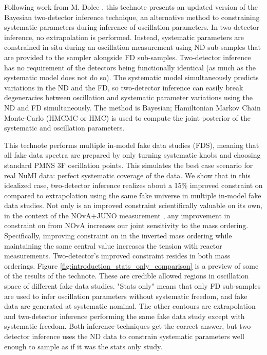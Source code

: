 \documentclass{article}
\begin{document}
Following work from M. Dolce \cite{ref:mike_thesis}, this technote presents an updated version of the Bayesian two-detector inference technique, an alternative method to constraining systematic parameters during inference of oscillation parameters. In two-detector inference, no extrapolation is performed. Instead, systematic parameters are constrained in-situ during an oscillation measurement using ND sub-samples that are provided to the sampler alongside FD sub-samples. Two-detector inference has no requirement of the detectors being functionally identical (as much as the systematic model does not do so). The systematic model simultaneously predicts variations in the ND and the FD, so two-detector inference can easily break degeneracies between oscillation and systematic parameter variations using the ND and FD simultaneously. The method is Bayesian; Hamiltonian Markov Chain Monte-Carlo (HMCMC or HMC) is used to compute the joint posterior of the systematic and oscillation parameters.

This technote performs multiple in-model fake data studies (FDS), meaning that all fake data spectra are prepared by only turning systematic knobs and choosing standard PMNS 3F oscillation points. This simulates the best case scenario for real NuMI data: perfect systematic coverage of the data. We show that in this idealized case, two-detector inference realizes about a 15\% improved constraint on  compared to extrapolation using the same fake universe in multiple in-model fake data studies. Not only is an improved constraint scientifically valuable on its own, in the context of the NOvA+JUNO measurement \cite{ref:nova_juno_paper} \cite{ref:juno_2026}, any improvement in constraint on  from NOvA increases our joint sensitivity to the mass ordering. Specifically, improving constraint on  in the inverted mass ordering while maintaining the same central value increases the tension with reactor measurements. Two-detector's improved constraint resides in both mass orderings. Figure \ref{fig:introduction_stats_only_comparison} is a preview of some of the results of the technote. These are credible allowed regions in oscillation space of different fake data studies. "Stats only" means that only FD sub-samples are used to infer oscillation parameters without systematic freedom, and fake data are generated at systematic nominal. The other contours are extrapolation and two-detector inference performing the same fake data study except with systematic freedom. Both inference techniques get the correct answer, but two-detector inference uses the ND data to constrain systematic parameters well enough to sample as if it was the stats only study.
\end{document}
